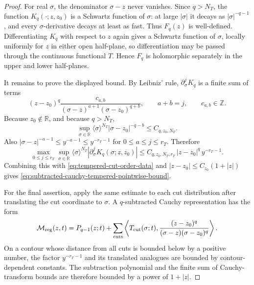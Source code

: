 \begin{proof}
For real \(\sigma\), the denominator \(\sigma-z\) never vanishes.  Since
\(q>N_T\), the function \(K_q(\cdot;z,z_0)\) is a Schwartz function of
\(\sigma\): at large \(|\sigma|\) it decays as \(|\sigma|^{-q-1}\), and every
\(\sigma\)-derivative decays at least as fast.  Thus \(F_q(z)\) is
well-defined.  Differentiating \(K_q\) with respect to \(z\) again gives a
Schwartz function of \(\sigma\), locally uniformly for \(z\) in either open
half-plane, so differentiation may be passed through the continuous
functional \(T\).  Hence \(F_q\) is holomorphic separately in the upper and
lower half-planes.

It remains to prove the displayed bound.  By Leibniz' rule,
\(\partial_\sigma^jK_q\) is a finite sum of terms
\begin{equation}
  (z-z_0)^q
  \frac{c_{a,b}}
  {(\sigma-z)^{a+1}(\sigma-z_0)^{q+b}},
  \qquad a+b=j,\qquad c_{a,b}\in\mathbb Z .
  \label{eq:subtracted-cauchy-kernel-derivative-term}
\end{equation}
Because \(z_0\notin\mathbb R\), and because \(q>N_T\),
\begin{equation}
  \sup_{\sigma\in\mathbb R}
  \langle\sigma\rangle^{N_T}|\sigma-z_0|^{-q-b}
  \le C_{q,z_0,N_T}.
  \label{eq:z0-subtraction-decay-bound}
\end{equation}
Also \(|\sigma-z|^{-a-1}\le y^{-a-1}\le y^{-r_T-1}\) for
\(0\le a\le j\le r_T\).  Therefore
\begin{equation}
  \max_{0\le j\le r_T}
  \sup_{\sigma\in\mathbb R}
  \langle\sigma\rangle^{N_T}
  |\partial_\sigma^jK_q(\sigma;z,z_0)|
  \le
  C_{q,z_0,N_T,r_T}\,|z-z_0|^q\,y^{-r_T-1}.
  \label{eq:subtracted-cauchy-kernel-seminorm-bound}
\end{equation}
Combining this with \eqref{eq:tempered-cut-order-data} and
\(|z-z_0|\le C_{z_0}(1+|z|)\) gives
\eqref{eq:subtracted-cauchy-tempered-pointwise-bound}.

For the final assertion, apply the same estimate to each cut distribution
after translating the cut coordinate to \(\sigma\).  A \(q\)-subtracted
Cauchy representation has the form
\begin{equation}
  \mathcal M_{\rm reg}(z,t)
  =
  P_{q-1}(z;t)
  +
  \sum_{\text{cuts}}
  \left\langle
    T_{\rm cut}(\sigma;t),
    \frac{(z-z_0)^q}{(\sigma-z)(\sigma-z_0)^q}
  \right\rangle .
  \label{eq:fixed-t-subtracted-cauchy-tempered-cuts}
\end{equation}
On a contour whose distance from all cuts is bounded below by a positive
number, the factor \(y^{-r_T-1}\) and its translated analogues are bounded by
contour-dependent constants.  The subtraction polynomial and the finite sum
of Cauchy-transform bounds are therefore bounded by a power of \(1+|z|\).
\end{proof}

